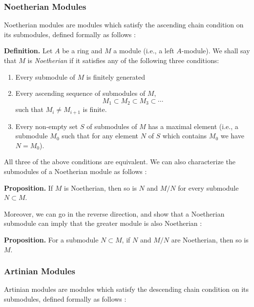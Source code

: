 \documentclass[11pt, reqno]{amsart}
\theoremstyle{plain}
\theoremstyle{definition}
\theoremstyle{example}
\begin{document}
\subsubsection{Noetherian Modules}

Noetherian modules are modules which satisfy the ascending chain condition on its submodules, defined formally as follows \cite[\S 10.1, p. 413]{lang}:

\par
\textbf{Definition.} Let $A$ be a ring and $M$ a module (i.e., a left $A$-module). We shall say that $M$ is \textit{Noetherian} if it satisfies any of the following three conditions:
\begin{enumerate}
\item Every submodule of $M$ is finitely generated

\item Every ascending sequence of submodules of $M$, $$M_1 \subset M_2 \subset M_3 \subset \cdots$$ such that $M_i \neq M_{i+1}$ is finite.

\item Every non-empty set $S$ of submodules of $M$ has a maximal element (i.e., a submodule $M_0$ such that for any element $N$ of $S$ which contains $M_0$ we have $N = M_0$).
\end{enumerate}

All three of the above conditions are equivalent. We can also characterize the submodules of a Noetherian module as follows \cite[Lec. 17, p. 4]{dau}:

\par
\textbf{Proposition.} If $M$ is Noetherian, then so is $N$ and $M/N$ for every submodule $N \subset M$.

\par
Moreover, we can go in the reverse direction, and show that a Noetherian submodule can imply that the greater module is also Noetherian \cite[Lec. 17, p. 4]{dau}:

\par
\textbf{Proposition.} For a submodule $N \subset M$, if $N$ and $M/N$ are Noetherian, then so is $M$.

\subsubsection{Artinian Modules}

Artinian modules are modules which satisfy the descending chain condition on its submodules, defined formally as follows \cite[\S 10.7, p. 439]{lang}:
\end{document}
